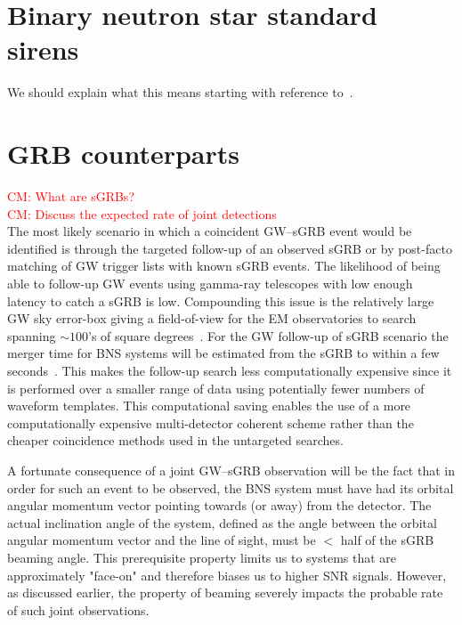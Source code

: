 \documentclass[12pt]{iopart}
\newcommand{\cm}[1]{\textcolor{red}{CM: #1}}
\begin{document}
\section{Binary neutron star standard sirens\label{sec:sirens}}

We should explain what this means starting with reference
to~\cite{1986Natur.323..310S}.

\section{GRB counterparts\label{sec:GRB}}

\cm{What are sGRBs?}\\

\cm{Discuss the expected rate of joint detections}\\

The most likely scenario in which a coincident \ac{GW}--\ac{sGRB} event would
be identified is through the targeted follow-up of an observed \ac{sGRB} or by
post-facto matching of \ac{GW} trigger lists with known \ac{sGRB} events.  The
likelihood of being able to follow-up \ac{GW} events using gamma-ray telescopes
with low enough latency to catch a \ac{sGRB} is low.  Compounding this issue is
the relatively large \ac{GW} sky error-box giving a field-of-view for the
\ac{EM} observatories to search spanning $\sim 100$'s of square
degrees~\cite{grb}.  For the \ac{GW} follow-up of \ac{sGRB} scenario the merger
time for \ac{BNS} systems will be estimated from the \ac{sGRB} to within a few
seconds~\cite{grb}.  This makes the follow-up search less computationally
expensive since it is performed over a smaller range of data using potentially
fewer numbers of waveform templates.  This computational saving enables the use
of a more computationally expensive multi-detector coherent scheme rather than
the cheaper coincidence methods used in the untargeted searches. 

A fortunate consequence of a joint \ac{GW}--\ac{sGRB} observation will be the
fact that in order for such an event to be observed, the \ac{BNS} system must
have had its orbital angular momentum vector pointing towards (or away) from
the detector.  The actual inclination angle of the system, defined as the angle
between the orbital angular momentum vector and the line of sight, must be $<$
half of the \ac{sGRB} beaming angle.  This prerequisite property limits us to
systems that are approximately "face-on" and therefore biases us to higher
\ac{SNR} signals.  However, as discussed earlier, the property of beaming
severely impacts the probable rate of such joint observations.   
\end{document}
